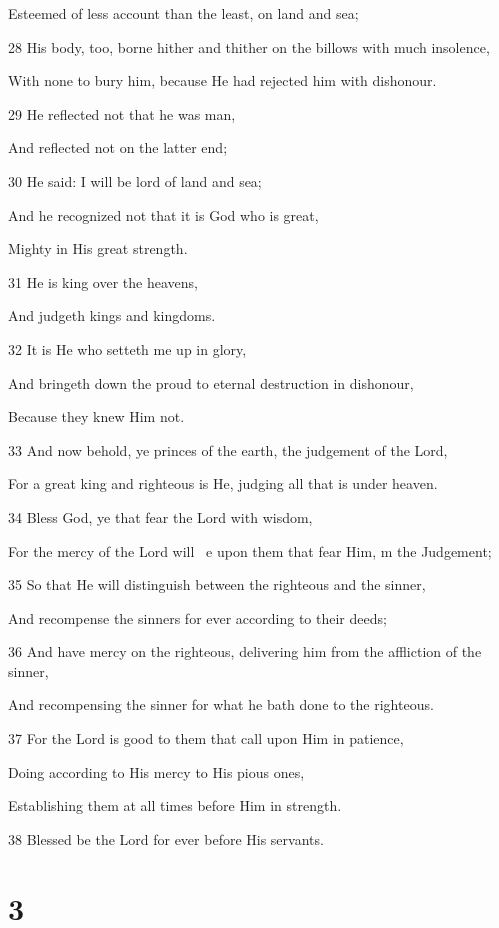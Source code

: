 \par  Esteemed of less account than the least, on land and sea;
\par 28 His body, too, borne hither and thither on the billows with much insolence,
\par  With none to bury him, because He had rejected him with dishonour.
\par 29 He reflected not that he was man,
\par  And reflected not on the latter end;
\par 30 He said: I will be lord of land and sea;
\par  And he recognized not that it is God who is great,
\par  Mighty in His great strength.
\par 31 He is king over the heavens,
\par  And judgeth kings and kingdoms.
\par 32 It is He who setteth me up in glory,
\par  And bringeth down the proud to eternal destruction in dishonour,
\par  Because they knew Him not.
\par 33 And now behold, ye princes of the earth, the judgement of the Lord,
\par  For a great king and righteous is He, judging all that is under heaven.
\par 34 Bless God, ye that fear the Lord with wisdom,
\par  For the mercy of the Lord will ~e upon them that fear Him, m the Judgement;
\par 35 So that He will distinguish between the righteous and the sinner,
\par  And recompense the sinners for ever according to their deeds;
\par 36 And have mercy on the righteous, delivering him from the affliction of the sinner,
\par  And recompensing the sinner for what he bath done to the righteous.
\par 37 For the Lord is good to them that call upon Him in patience,
\par  Doing according to His mercy to His pious ones,
\par  Establishing them at all times before Him in strength.
\par 38 Blessed be the Lord for ever before His servants.

\chapter{3}

